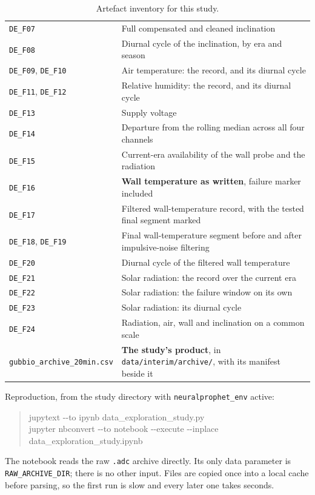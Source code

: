 \documentclass[11pt,a4paper]{article}
\begin{document}
\begin{table}[H]
\begin{tabularx}{\textwidth}{L{4.6cm}Y}
\texttt{DE\_F07} & Full compensated and cleaned inclination \\
\texttt{DE\_F08} & Diurnal cycle of the inclination, by era and season \\
\texttt{DE\_F09}, \texttt{DE\_F10} & Air temperature: the record, and its diurnal
cycle \\
\texttt{DE\_F11}, \texttt{DE\_F12} & Relative humidity: the record, and its
diurnal cycle \\
\texttt{DE\_F13} & Supply voltage \\
\texttt{DE\_F14} & Departure from the rolling median across all four channels \\
\addlinespace
\texttt{DE\_F15} & Current-era availability of the wall probe and the radiation \\
\texttt{DE\_F16} & \textbf{Wall temperature as written}, failure marker
included \\
\texttt{DE\_F17} & Filtered wall-temperature record, with the tested final
segment marked \\
\texttt{DE\_F18}, \texttt{DE\_F19} & Final wall-temperature segment before and
after impulsive-noise filtering \\
\texttt{DE\_F20} & Diurnal cycle of the filtered wall temperature \\
\texttt{DE\_F21} & Solar radiation: the record over the current era \\
\texttt{DE\_F22} & Solar radiation: the failure window on its own \\
\texttt{DE\_F23} & Solar radiation: its diurnal cycle \\
\texttt{DE\_F24} & Radiation, air, wall and inclination on a common scale \\
\addlinespace
\texttt{gubbio\_archive\_20min.csv} & \textbf{The study's product}, in
\texttt{data/interim/archive/}, with its manifest beside it \\
\bottomrule
\end{tabularx}
\caption{Artefact inventory for this study.}
\label{tab:artefacts}
\end{table}

Reproduction, from the study directory with \texttt{neuralprophet\_env} active:

\begin{quote}
\ttfamily\small
jupytext -{}-to ipynb data\_exploration\_study.py \\
jupyter nbconvert -{}-to notebook -{}-execute -{}-inplace \\
\phantom{jupyter nbconvert }data\_exploration\_study.ipynb
\end{quote}

The notebook reads the raw \texttt{.adc} archive directly. Its only data parameter is \texttt{RAW\_ARCHIVE\_DIR}; there is no other input. Files are copied once into a local cache before parsing, so the first run is slow and every later one takes seconds.
\end{document}
